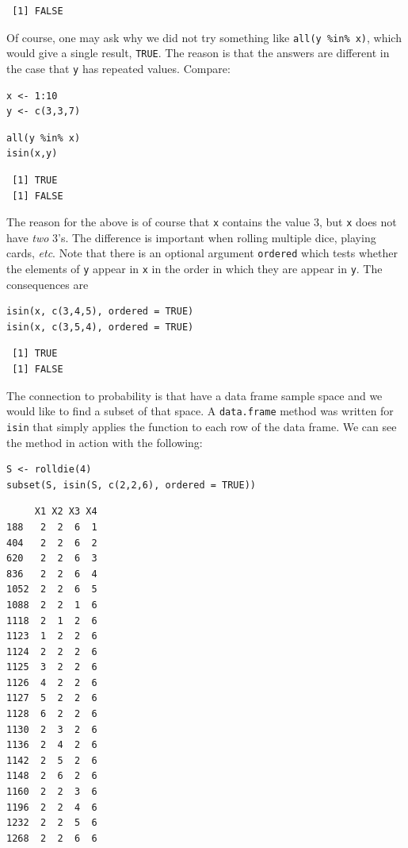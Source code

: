 \documentclass[captions=tableheading]{scrbook}
\begin{document}
\begin{verbatim}
 [1] FALSE
\end{verbatim}

Of course, one may ask why we did not try something like \texttt{all(y \%in\% x)}, which would give a single result, \texttt{TRUE}. The reason is that the answers are different in the case that \texttt{y} has repeated values. Compare: 


\lstset{language=R}
\begin{lstlisting}
x <- 1:10 
y <- c(3,3,7)
\end{lstlisting}


\lstset{language=R}
\begin{lstlisting}
all(y %in% x)
isin(x,y)
\end{lstlisting}

\begin{verbatim}
 [1] TRUE
 [1] FALSE
\end{verbatim}

The reason for the above is of course that \texttt{x} contains the value 3, but \texttt{x} does not have \emph{two} 3's. The difference is important when rolling multiple dice, playing cards, \emph{etc}. Note that there is an optional argument \texttt{ordered} which tests whether the elements of \texttt{y} appear in \texttt{x} in the order in which they are appear in \texttt{y}. The consequences are 


\lstset{language=R}
\begin{lstlisting}
isin(x, c(3,4,5), ordered = TRUE) 
isin(x, c(3,5,4), ordered = TRUE)
\end{lstlisting}

\begin{verbatim}
 [1] TRUE
 [1] FALSE
\end{verbatim}

The connection to probability is that have a data frame sample space and we would like to find a subset of that space. A \texttt{data.frame} method was written for \texttt{isin} that simply applies the function to each row of the data frame. We can see the method in action with the following: 


\lstset{language=R}
\begin{lstlisting}
S <- rolldie(4) 
subset(S, isin(S, c(2,2,6), ordered = TRUE))
\end{lstlisting}


\begin{verbatim}
     X1 X2 X3 X4
188   2  2  6  1
404   2  2  6  2
620   2  2  6  3
836   2  2  6  4
1052  2  2  6  5
1088  2  2  1  6
1118  2  1  2  6
1123  1  2  2  6
1124  2  2  2  6
1125  3  2  2  6
1126  4  2  2  6
1127  5  2  2  6
1128  6  2  2  6
1130  2  3  2  6
1136  2  4  2  6
1142  2  5  2  6
1148  2  6  2  6
1160  2  2  3  6
1196  2  2  4  6
1232  2  2  5  6
1268  2  2  6  6
\end{verbatim}
\end{document}
